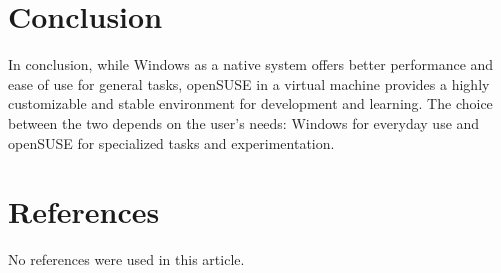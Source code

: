 \documentclass{article}
\begin{document}
\section{Conclusion}
In conclusion, while Windows as a native system offers better performance and ease of use for general tasks, openSUSE in a virtual machine provides a highly customizable and stable environment for development and learning. The choice between the two depends on the user's needs: Windows for everyday use and openSUSE for specialized tasks and experimentation.

\section{References}
No references were used in this article.
\end{document}
